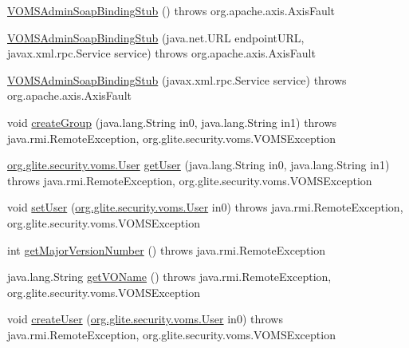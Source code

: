 \begin{DoxyCompactItemize}
\item 
\hyperlink{classorg_1_1glite_1_1security_1_1voms_1_1service_1_1admin_1_1VOMSAdminSoapBindingStub_a3f5f3bd5443ea39cf0f2dd15f41cd77e}{VOMSAdminSoapBindingStub} ()  throws org.apache.axis.AxisFault 
\item 
\hyperlink{classorg_1_1glite_1_1security_1_1voms_1_1service_1_1admin_1_1VOMSAdminSoapBindingStub_a1bd55a3e3b2c21f14c29d5de1b313004}{VOMSAdminSoapBindingStub} (java.net.URL endpointURL, javax.xml.rpc.Service service)  throws org.apache.axis.AxisFault 
\item 
\hyperlink{classorg_1_1glite_1_1security_1_1voms_1_1service_1_1admin_1_1VOMSAdminSoapBindingStub_a4032c2d277be741bbe747f749bab2369}{VOMSAdminSoapBindingStub} (javax.xml.rpc.Service service)  throws org.apache.axis.AxisFault 
\item 
void \hyperlink{classorg_1_1glite_1_1security_1_1voms_1_1service_1_1admin_1_1VOMSAdminSoapBindingStub_abd923cf2ff44dea89688bfafb2a4366c}{createGroup} (java.lang.String in0, java.lang.String in1)  throws java.rmi.RemoteException, org.glite.security.voms.VOMSException 
\item 
\hyperlink{classorg_1_1glite_1_1security_1_1voms_1_1User}{org.glite.security.voms.User} \hyperlink{classorg_1_1glite_1_1security_1_1voms_1_1service_1_1admin_1_1VOMSAdminSoapBindingStub_a6a0f4c4343f0136699d55a7f5b6c43d8}{getUser} (java.lang.String in0, java.lang.String in1)  throws java.rmi.RemoteException, org.glite.security.voms.VOMSException 
\item 
void \hyperlink{classorg_1_1glite_1_1security_1_1voms_1_1service_1_1admin_1_1VOMSAdminSoapBindingStub_ab4ef2d658fb90f3076affbe82658e660}{setUser} (\hyperlink{classorg_1_1glite_1_1security_1_1voms_1_1User}{org.glite.security.voms.User} in0)  throws java.rmi.RemoteException, org.glite.security.voms.VOMSException 
\item 
int \hyperlink{classorg_1_1glite_1_1security_1_1voms_1_1service_1_1admin_1_1VOMSAdminSoapBindingStub_a41ccfcc7f640042a5dccde32ecbf0f64}{getMajorVersionNumber} ()  throws java.rmi.RemoteException 
\item 
java.lang.String \hyperlink{classorg_1_1glite_1_1security_1_1voms_1_1service_1_1admin_1_1VOMSAdminSoapBindingStub_a09138e84dedb54ecf3f1fe17a7d9b8bd}{getVOName} ()  throws java.rmi.RemoteException, org.glite.security.voms.VOMSException 
\item 
void \hyperlink{classorg_1_1glite_1_1security_1_1voms_1_1service_1_1admin_1_1VOMSAdminSoapBindingStub_a335dd88ce2823738d6c71919df1cbaee}{createUser} (\hyperlink{classorg_1_1glite_1_1security_1_1voms_1_1User}{org.glite.security.voms.User} in0)  throws java.rmi.RemoteException, org.glite.security.voms.VOMSException 

\end{DoxyCompactItemize}
